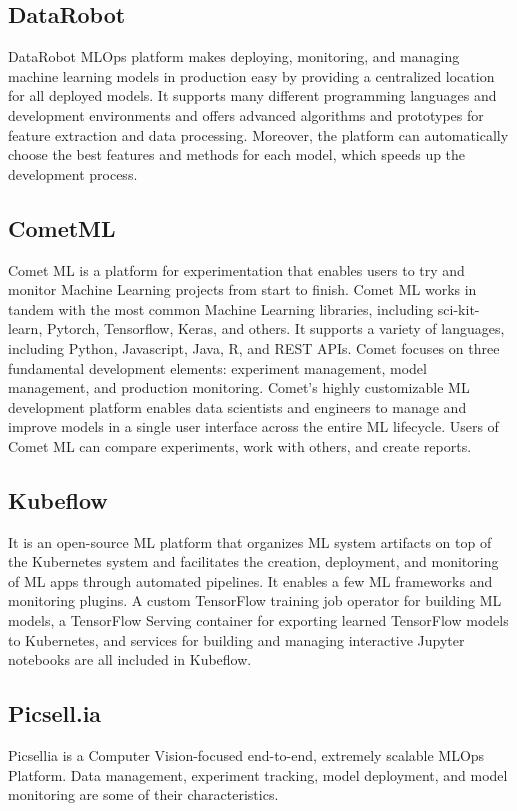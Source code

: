 \documentclass[12pt,a4paper]{report}     %
\begin{document}
\begin{normalsize}
{\subsection{DataRobot}
DataRobot MLOps platform makes deploying, monitoring, and managing machine learning models in production easy by providing a centralized location for all deployed models. It supports many different programming languages and development environments and offers advanced algorithms and prototypes for feature extraction and data processing\cite{b3}. Moreover, the platform can automatically choose the best features and methods for each model, which speeds up the development process.

\subsection{CometML}
Comet ML is a platform for experimentation that enables users to try and monitor Machine Learning projects from start to finish\cite{b4}. Comet ML works in tandem with the most common Machine Learning libraries, including sci-kit-learn, Pytorch, Tensorflow, Keras, and others. It supports a variety of languages, including Python, Javascript, Java, R, and REST APIs. Comet focuses on three fundamental development elements: experiment management, model management, and production monitoring. Comet's highly customizable ML development platform enables data scientists and engineers to manage and improve models in a single user interface across the entire ML lifecycle. Users of Comet ML can compare experiments, work with others, and create reports.

\subsection{Kubeflow}
It is an open-source ML platform that organizes ML system artifacts on top of the Kubernetes system and facilitates the creation, deployment, and monitoring of ML apps through automated pipelines\cite{b5}. It enables a few ML frameworks and monitoring plugins. A custom TensorFlow training job operator for building ML models, a TensorFlow Serving container for exporting learned TensorFlow models to Kubernetes, and services for building and managing interactive Jupyter notebooks are all included in Kubeflow.

\subsection{Picsell.ia}
Picsellia is a Computer Vision-focused end-to-end, extremely scalable MLOps Platform\cite{b6}. Data management, experiment tracking, model deployment, and model monitoring are some of their characteristics.

}
\end{normalsize}
\end{document}
